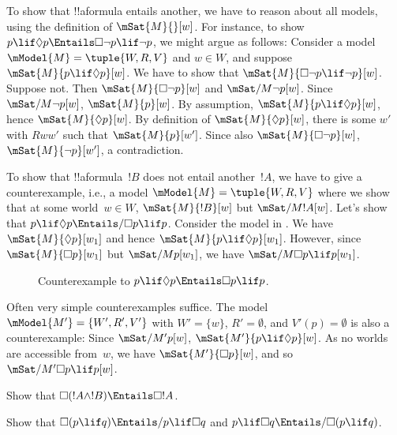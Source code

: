 \documentclass[../../../include/open-logic-section]{subfiles}
\begin{document}
\begin{ex}
  To show that !!a{formula} entails another, we have to reason about
  all models, using the definition of $\mSat{M}{}[w]$. For instance,
  to show $p \lif \Diamond p \Entails \Box\lnot p \lif \lnot p$, we
  might argue as follows: Consider a model $\mModel{M} = \tuple{W, R,
    V}$ and $w \in W$, and suppose $\mSat{M}{p \lif \Diamond
    p}[w]$. We have to show that $\mSat{M}{\Box\lnot p \lif \lnot
    p}[w]$. Suppose not. Then $\mSat{M}{\Box\lnot p}[w]$ and
  $\mSat/{M}{\lnot p}[w]$. Since $\mSat/{M}{\lnot p}[w]$, $\mSat{M}{
    p}[w]$. By assumption, $\mSat{M}{p \lif \Diamond p}[w]$, hence
  $\mSat{M}{\Diamond p}[w]$. By definition of $\mSat{M}{\Diamond
    p}[w]$, there is some $w'$ with $Rww'$ such that
  $\mSat{M}{p}[w']$. Since also $\mSat{M}{\Box \lnot p}[w]$,
  $\mSat{M}{\lnot p}[w']$, a contradiction.

  To show that !!a{formula}~$!B$ does not entail another~$!A$, we have
  to give a counterexample, i.e., a model $\mModel{M} = \tuple{W, R,
    V}$ where we show that at some world~$w \in W$, $\mSat{M}{!B}[w]$
  but $\mSat/{M}{!A}[w]$. Let's show that $p \lif \Diamond p \Entails/
  \Box p \lif p$. Consider the model in .  We
  have $\mSat{M}{\Diamond p}[w_1]$ and hence $\mSat{M}{p \lif
    \Diamond p}[w_1]$. However, since $\mSat{M}{\Box p}[w_1]$ but
  $\mSat/{M}{p}[w_1]$, we have $\mSat/{M}{\Box p \lif p}[w_1]$.
  \begin{figure}
  \begin{center}
  \end{center}
  \caption{Counterexample to $p \lif \Diamond p
  \Entails \Box p \lif p$.}
  \end{figure}
  
  Often very simple counterexamples suffice. The model $\mModel{M'} =
  \{W', R', V'\}$ with $W' = \{w\}$, $R' = \emptyset$, and $V'(p) =
  \emptyset$ is also a counterexample: Since $\mSat/{M'}{p}[w]$,
  $\mSat{M'}{p \lif \Diamond p}[w]$. As no worlds are accessible
  from~$w$, we have $\mSat{M'}{\Box p}[w]$, and so $\mSat/{M'}{\Box p
    \lif p}[w]$.
\end{ex}

\begin{prob}
  Show that $\Box (!A \land !B) \Entails \Box !A$.
\end{prob}

\begin{prob}
  Show that $\Box (p \lif q) \Entails/ p \lif \Box q$ and $p \lif \Box
  q \Entails/\Box (p \lif q)$.
\end{prob}
\end{document}
